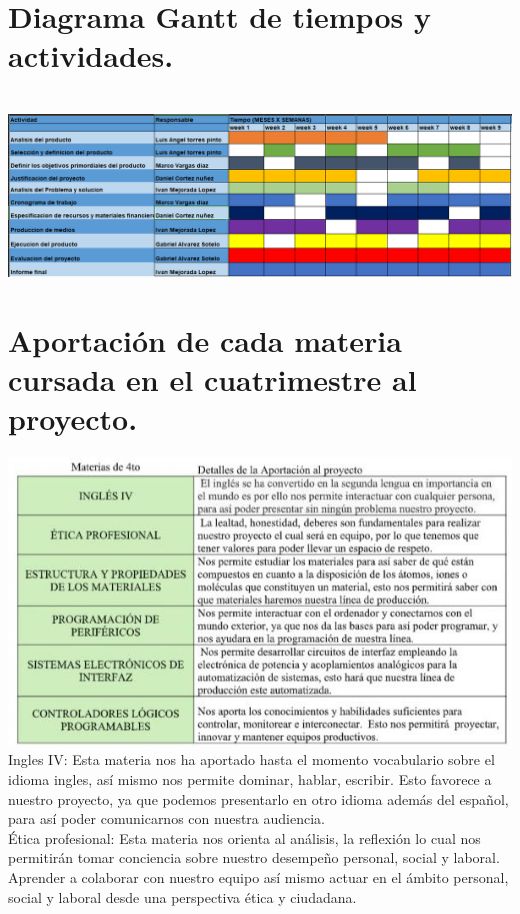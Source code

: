 \documentclass[10pt,a4paper]{article}
\begin{document}
\section{Diagrama Gantt de tiempos y actividades.}\\
\includegraphics[scale=.42]{gantt.png} 
\\
\raggedright
\section{Aportación de cada materia cursada en el cuatrimestre al proyecto.}
\includegraphics[scale=.70]{tabla.jpeg} 
\\
Ingles IV: Esta materia nos ha aportado hasta el momento vocabulario sobre el idioma ingles, así mismo nos permite dominar, hablar, escribir. Esto favorece a nuestro proyecto, ya que podemos presentarlo en otro idioma además del español, para así poder comunicarnos con nuestra audiencia.\\

Ética profesional: Esta materia nos orienta al análisis, la reflexión lo cual nos permitirán tomar conciencia sobre nuestro desempeño personal, social y laboral. Aprender a colaborar con nuestro equipo así mismo actuar en el ámbito personal, social y laboral desde una perspectiva ética y ciudadana.\\
\end{document}
